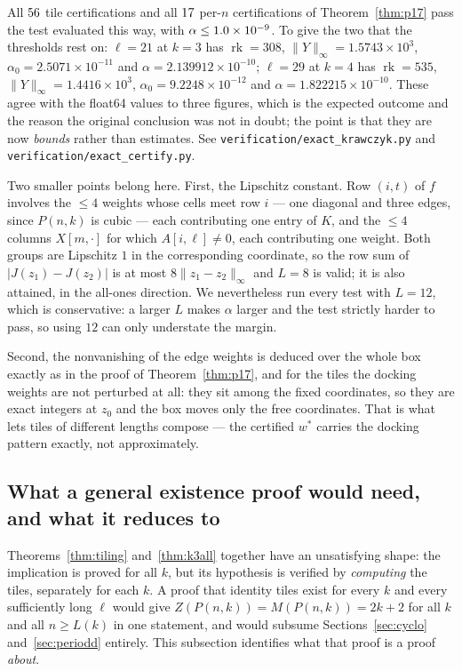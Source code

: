 \documentclass[11pt]{article}
\theoremstyle{definition}
\begin{document}
All $56$ tile certifications and all $17$ per-$n$
certifications of Theorem~\ref{thm:p17} pass the test evaluated this way, with
$\alpha\le1.0\times10^{-9}$. To give the two that the thresholds rest on:
$\ell=21$ at $k=3$ has $\operatorname{rk}=308$,
$\|Y\|_\infty=1.5743\times10^{3}$, $\alpha_0=2.5071\times10^{-11}$ and
$\alpha=2.139912\times10^{-10}$; $\ell=29$ at $k=4$ has
$\operatorname{rk}=535$, $\|Y\|_\infty=1.4416\times10^{3}$,
$\alpha_0=9.2248\times10^{-12}$ and $\alpha=1.822215\times10^{-10}$. These agree
with the float64 values to three figures, which is the expected outcome and the
reason the original conclusion was not in doubt; the point is that they are now
\emph{bounds} rather than estimates. See
\texttt{verification/exact\_krawczyk.py} and
\texttt{verification/exact\_certify.py}.

Two smaller points belong here. First, the Lipschitz constant. Row $(i,t)$ of
$f$ involves the $\le4$ weights whose cells meet row $i$ --- one diagonal and
three edges, since $P(n,k)$ is cubic --- each contributing one entry of $K$, and
the $\le4$ columns $X[m,\cdot]$ for which $A[i,\ell]\ne0$, each contributing one
weight. Both groups are Lipschitz $1$ in the corresponding coordinate, so the
row sum of $|J(z_1)-J(z_2)|$ is at most $8\|z_1-z_2\|_\infty$ and $L=8$ is
valid; it is also attained, in the all-ones direction. We nevertheless run every
test with $L=12$, which is conservative: a larger $L$ makes $\alpha$ larger and
the test strictly harder to pass, so using $12$ can only understate the margin.

Second, the nonvanishing of the edge weights is deduced over the whole box
exactly as in the proof of Theorem~\ref{thm:p17}, and for the tiles the docking
weights are not perturbed at all: they sit among the fixed coordinates, so they
are exact integers at $z_0$ and the box moves only the free coordinates. That is
what lets tiles of different lengths compose --- the certified $w^\ast$ carries
the docking pattern exactly, not approximately.

\subsection*{What a general existence proof would need, and what it reduces to}
\label{sec:symplectic}
Theorems~\ref{thm:tiling} and~\ref{thm:k3all} together have an unsatisfying
shape: the implication is proved for all $k$, but its hypothesis is verified by
\emph{computing} the tiles, separately for each $k$. A proof that identity tiles
exist for every $k$ and every sufficiently long $\ell$ would give
$Z(P(n,k))=M(P(n,k))=2k+2$ for all $k$ and all $n\ge L(k)$ in one statement, and
would subsume Sections~\ref{sec:cyclo} and~\ref{sec:periodd} entirely. This
subsection identifies what that proof is a proof \emph{about}.
\end{document}
